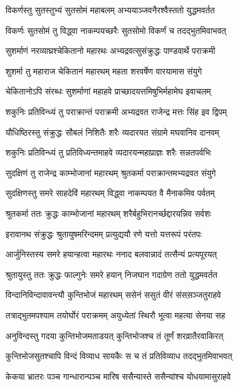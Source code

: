 \twolineshloka
{विकर्णस्तु सुतस्तुभ्यं सुतसोमं महाबलम्}
{अभ्ययाञ्जवनैरश्वैस्ततो युद्धमवर्तत}


\twolineshloka
{विकर्णः सुतसोमं तु विद्ध्वा नाकम्पयच्छरैः}
{सुतसोमो विकर्णं च तदद्भुतमिवाभवत्}


\twolineshloka
{सुशर्माणं नरव्याघ्रश्चेकितानो महारथः}
{अभ्यद्रवत्सुसंक्रुद्धः पाण्डवार्थे पराक्रमी}


\twolineshloka
{शुशर्मा तु महाराज चेकितानं महारथम्}
{महता शरवर्षेण वारयामास संयुगे}


\twolineshloka
{चेकितानोऽपि संरब्धः सुशर्माणां महाहवे}
{प्राच्छादयत्तमिषुभिर्महामेघ इवाचलम्}


\twolineshloka
{शकुनिः प्रतिविन्ध्यं तु पराक्रान्तं पराक्रमी}
{अभ्यद्रवत राजेन्द्र मत्तः सिंह इव द्विपम्}


\twolineshloka
{यौधिष्ठिरस्तु संक्रुद्धः सौबलं निशितैः शरैः}
{व्यदारयत संग्रामे मघवानिव दानवम्}


\twolineshloka
{शकुनिः प्रतिविन्ध्यं तु प्रतिविध्यन्तमाहवे}
{व्यदारयन्महाप्राज्ञः शरैः सन्नतपर्वभिः}


\twolineshloka
{सुदक्षिणं तु राजेन्द्र काम्भोजानां महारथम्}
{श्रुतकर्मा पराक्रान्तमभ्यद्रवत संयुगे}


\twolineshloka
{सुदक्षिणस्तु समरे साहदेविं महारथम्}
{विद्ध्वा नाकम्पयत वै मैनाकमिव पर्वतम्}


\twolineshloka
{श्रुतकर्मा ततः क्रुद्धः काम्भोजानां महारथम्}
{शरैर्बहुभिरानर्च्छद्दारयन्निव सर्वशः}


\twolineshloka
{इरावानथ संक्रुद्धः श्रुतायुषमरिन्दमम्}
{प्रत्युद्ययौ रणे यत्तो यत्तरूपं परंतपः}


\twolineshloka
{आर्जुनिस्तस्य समरे हयान्हत्वा महारथः}
{ननाद बलवान्नादं तत्सैन्यं प्रत्यपूरयत्}


\twolineshloka
{श्रुतायुस्तु ततः क्रुद्धः फाल्गुनेः समरे हयान्}
{निजघान गदाग्रेण ततो युद्धमवर्तत}


\twolineshloka
{विन्दानिविन्दावावन्त्यौ कुन्तिभोजं महारथम्}
{ससेनं ससुतं वीरं संसस़ञ्जतुराहवे}


\twolineshloka
{तत्राद्भुतमपश्याम तयोर्घोरं पराक्रमम्}
{अयुध्येतां स्थिरौ भूत्वा महत्या सेनया सह}


\twolineshloka
{अनुविन्दस्तु गदया कुन्तिभोजमताडयत्}
{कुन्तिभोजश्च तं तूर्णं शरव्रातैरवाकिरत्}


\twolineshloka
{कुन्तिभोजसुतश्चापि विन्दं विव्याध सायकैः}
{स च तं प्रतिविव्याध तदद्भुतमिवाभवत्}


\twolineshloka
{केकया भ्रातरः पञ्च गान्धारान्पञ्च मारिष}
{ससैन्यास्ते ससैन्यांश्च योधयामासुराहवे}


